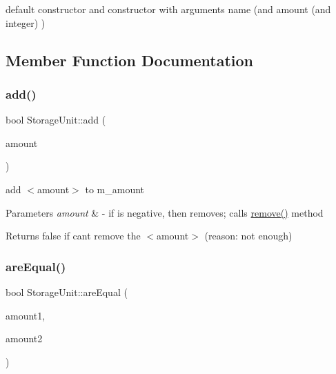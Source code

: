 default constructor and constructor with arguments name (and amount (and integer) ) 



\subsection{Member Function Documentation}
\mbox{\label{classStorageUnit_aa454fd2b3fc333e7487327b77d9f9321}} 
\subsubsection{\texorpdfstring{add()}{add()}}
{\footnotesize\ttfamily bool Storage\+Unit\+::add (\begin{DoxyParamCaption}\item[{const \hyperlink{StorageUnit_8hpp_a13b2ba6b0400e1aa0b57282bd1228f20}{Unit\+Amount}}]{amount }\end{DoxyParamCaption})}

add $<$amount$>$ to m\+\_\+amount 
\begin{DoxyParams}{Parameters}
{\em amount} & -\/ if is negative, then removes; calls \hyperlink{classStorageUnit_a790ca821c741cdf98d83d10ee68fe7e4}{remove()} method \\
\hline
\end{DoxyParams}
\begin{DoxyReturn}{Returns}
false if can\textquotesingle{}t remove the $<$amount$>$ (reason\+: not enough) 
\end{DoxyReturn}
\mbox{\label{classStorageUnit_a21699592d4c02bdf864e06c615a7f0c7}} 
\subsubsection{\texorpdfstring{are\+Equal()}{areEqual()}}
{\footnotesize\ttfamily bool Storage\+Unit\+::are\+Equal (\begin{DoxyParamCaption}\item[{const \hyperlink{StorageUnit_8hpp_a13b2ba6b0400e1aa0b57282bd1228f20}{Unit\+Amount}}]{amount1,  }\item[{const \hyperlink{StorageUnit_8hpp_a13b2ba6b0400e1aa0b57282bd1228f20}{Unit\+Amount}}]{amount2 }\end{DoxyParamCaption})\hspace{0.3cm}{\ttfamily [static]}}

